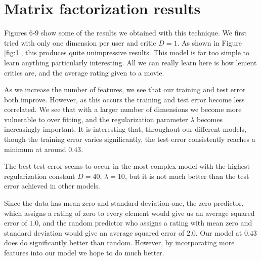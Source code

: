 \documentclass[12pt]{article}
\begin{document}
\section{Matrix factorization results}

Figures 6-9 show some of the results we obtained with this technique. We first tried with only one dimension per user and critic $D=1$. As shown in Figure \ref{fig:1}, this produces quite unimpressive results. This model is far too simple to learn anything particularly interesting. All we can really learn here is how lenient critics are, and the average rating given to a movie.

As we increase the number of features, we see that our training and test error both improve. However, as this occurs the training and test error become less correlated. We see that with a larger number of dimensions we become more vulnerable to over fitting, and the regularization parameter $\lambda$ becomes increasingly important. It is interesting that, throughout our different models, though the training error varies significantly, the test error consistently reaches a minimum at around $0.43$. 

The best test error seems to occur in the most complex model with the highest regularization constant $D=40$, $\lambda = 10$, but it is not much better than the test error achieved in other models.

Since the data has mean zero and standard deviation one, the zero predictor, which assigns a rating of zero to every element would give us an average squared error of $1.0$, and the random predictor who assigns a rating with mean zero and standard deviation would give an average squared error of $2.0$. Our model at $0.43$ does do significantly better than random. However, by incorporating more features into our model we hope to do much better.
\end{document}
